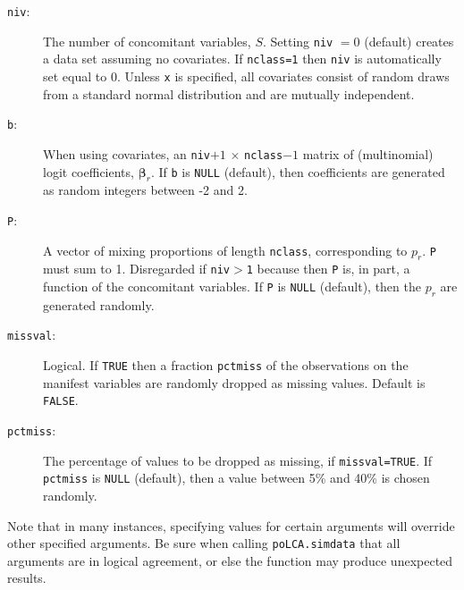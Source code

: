 \documentclass[letterpaper,12pt]{article}
\begin{document}
\begin{description}
    \item [\texttt{niv}:] The number of concomitant variables, $S$.  Setting \texttt{niv} $=0$ (default) creates a data set assuming no covariates. If \texttt{nclass=1} then \texttt{niv} is automatically set equal to 0. Unless \texttt{x} is specified, all covariates consist of random draws from a standard normal distribution and are mutually independent.
    \item [\texttt{b}:] When using covariates, an \texttt{niv}$+1$ $\times$ \texttt{nclass}$-1$ matrix of (multinomial) logit coefficients, $\boldsymbol{\beta}_r$. If \texttt{b} is \texttt{NULL} (default), then coefficients are generated as random integers between -2 and 2.
    \item [\texttt{P}:] A vector of mixing proportions of length \texttt{nclass}, corresponding to $p_r$. \texttt{P} must sum to 1.  Disregarded if \texttt{niv}$>$\texttt{1} because then \texttt{P} is, in part, a function of the concomitant variables.  If \texttt{P} is \texttt{NULL} (default), then the $p_r$ are generated randomly.
    \item [\texttt{missval}:] Logical. If \texttt{TRUE} then a fraction \texttt{pctmiss} of the observations on the manifest variables are randomly dropped as missing values. Default is \texttt{FALSE}.
    \item [\texttt{pctmiss}:] The percentage of values to be dropped as missing, if \texttt{missval=TRUE}.  If \texttt{pctmiss} is \texttt{NULL} (default), then a value between 5\% and 40\% is chosen randomly.
\end{description}
Note that in many instances, specifying values for certain arguments will override other specified arguments. Be sure when calling \texttt{poLCA.simdata} that all arguments are in logical agreement, or else the function may produce unexpected results.
\end{document}
